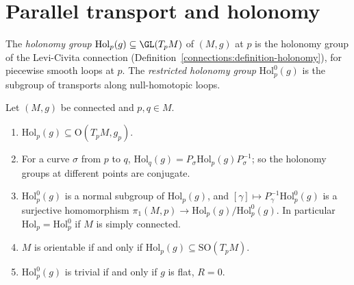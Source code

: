 \section{Parallel transport and holonomy}\label{riemannian-geometry:section-holonomy}

The \emph{holonomy group} $\mathrm{Hol}_p(g) \subseteq \GL(T_pM)$ of $(M, g)$ at $p$ is the holonomy group of the Levi-Civita connection (Definition~\ref{connections:definition-holonomy}), for piecewise smooth loops at $p$. The
\emph{restricted holonomy group} $\mathrm{Hol}^0_p(g)$ is the subgroup of transports along null-homotopic loops.

\begin{proposition}\label{riemannian-geometry:proposition-holonomy-basic}
Let $(M, g)$ be connected and $p, q \in M$.
\begin{enumerate}
\item $\mathrm{Hol}_p(g) \subseteq \mathrm{O}(T_pM, g_p)$.
\item For a curve $\sigma$ from $p$ to $q$, $\mathrm{Hol}_q(g) = P_\sigma\mathrm{Hol}_p(g)P_\sigma^{-1}$; so the holonomy groups at different points are conjugate.
\item $\mathrm{Hol}^0_p(g)$ is a normal subgroup of $\mathrm{Hol}_p(g)$, and $[\gamma] \mapsto P_\gamma^{-1}\mathrm{Hol}^0_p(g)$ is a surjective homomorphism $\pi_1(M, p) \to \mathrm{Hol}_p(g)/\mathrm{Hol}^0_p(g)$. In particular
$\mathrm{Hol}_p = \mathrm{Hol}^0_p$ if $M$ is simply connected.
\item $M$ is orientable if and only if $\mathrm{Hol}_p(g) \subseteq \mathrm{SO}(T_pM)$.
\item $\mathrm{Hol}^0_p(g)$ is trivial if and only if $g$ is flat, $R = 0$.
\end{enumerate}
\end{proposition}

